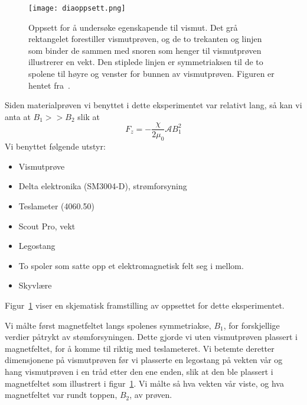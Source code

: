 \documentclass[a4paper,11pt, twocolumn]{article}
\begin{document}
\begin{figure}[!ht]
	\centering
	\texttt{[image: diaoppsett.png]}
	\caption{Oppsett for å undersøke egenskapende til vismut. Det grå rektangelet forestiller vismutprøven, og de to trekanten og linjen som binder de sammen med snoren som henger til vismutprøven illustrerer en vekt. Den stiplede linjen er symmetriaksen til de to spolene til høyre og venster for bunnen av vismutprøven. Figuren er hentet fra~\cite{fys1120}.}
	\label{fig:diaoppsett}
\end{figure}
Siden materialprøven vi benyttet i dette eksperimentet var relativt lang, så kan vi anta at $B_1>>B_2$ slik at 
\begin{equation}
	F_z = -\frac{\chi}{2\mu_0}\mathcal{A}B_1^2
	\label{eq:diaForenklet}
\end{equation}
Vi benyttet følgende utstyr:
\begin{itemize}
	\item Vismutprøve
	\item Delta elektronika (SM3004-D), strømforsyning
	\item Teslameter (4060.50)
	\item Scout Pro, vekt
	\item Legostang
	\item To spoler som satte opp et elektromagnetisk felt seg i mellom.
	\item Skyvlære
\end{itemize}
Figur~\ref{fig:diaoppsett} viser en skjematisk framstilling av oppsettet for dette eksperimentet.

Vi målte først magnetfeltet langs spolenes symmetriakse, $B_1$, for forskjellige verdier påtrykt av stømforsyningen. Dette gjorde vi uten vismutprøven plassert i magnetfeltet, for å komme til riktig med teslameteret. Vi betemte deretter dimensjonene på vismutprøven før vi plasserte en legostang på vekten vår og hang vismutprøven i en tråd etter den ene enden, slik at den ble plassert i magnetfeltet som illustrert i figur~\ref{fig:diaoppsett}. Vi målte så hva vekten vår viste, og hva magnetfeltet var rundt toppen, $B_2$, av prøven.
\end{document}
